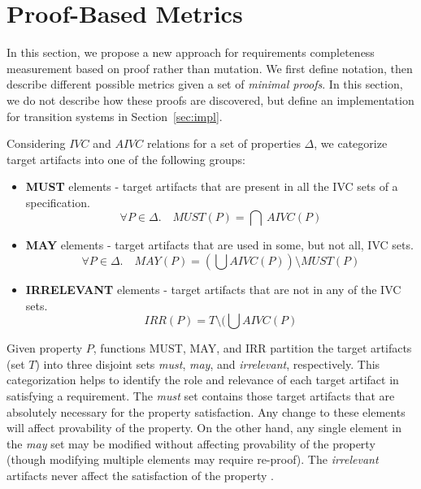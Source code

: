 \newcommand{\minproofcov}{\text{\sc MinProof-Cov}}


\section{Proof-Based Metrics}
\label{sec:method}

In this section, we propose a new approach for       requirements completeness measurement based on proof rather than mutation.  We first define notation, then describe different possible metrics given a set of {\em minimal proofs}.  In this section, we do not describe how these proofs are discovered, but define an implementation for transition systems in Section~\ref{sec:impl}.


Considering $IVC$ and $AIVC$ relations for a set of properties $\Delta$, we categorize target artifacts into one of the following groups:

\begin{itemize}
  \item \textbf{MUST} elements - target artifacts that are present in all the IVC sets of a specification.
      \[
      \forall P \in \Delta.\quad MUST (P) = \bigcap \ AIVC(P)
      \]

  \item \textbf{MAY} elements - target artifacts that are used in some, but not all, IVC sets.
      \[
      \forall P \in \Delta .\quad MAY(P) = (\bigcup AIVC (P)) \setminus MUST (P)
      \]

  \item \textbf{IRRELEVANT} elements - target artifacts that are not in any of the IVC sets.
  $$IRR(P) = T \setminus (\bigcup AIVC (P)$$
\end{itemize}

Given property $P$, functions MUST, MAY, and IRR partition the target artifacts (set $T$) into three disjoint sets \emph{must}, \emph{may}, and \emph{irrelevant}, respectively. This categorization helps to identify the role and relevance of each target artifact in satisfying a requirement. The \emph{must} set contains those target artifacts that are absolutely necessary for the property satisfaction.  Any change to these elements will affect provability of the property. On the other hand, any single element in the \emph{may} set may be modified without affecting provability of the property (though modifying multiple elements may require re-proof).   The \emph{irrelevant} artifacts never affect the satisfaction of the property \cite{Murugesan16:renext}.

